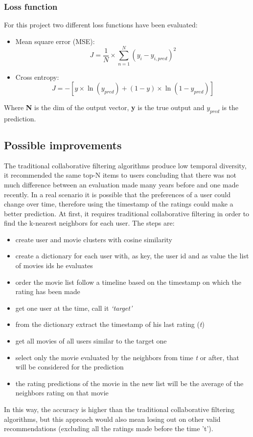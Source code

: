 \documentclass{article}
\begin{document}
\subsubsection{Loss function}
For this project two different loss functions have been evaluated: 
\begin{itemize}
    \item Mean square error (MSE):
    \begin{equation}\nonumber
        J = \frac{1}{N} \times \sum_{n=1}^{N} (y_i - y_{i,pred})^2
    \end{equation}
    
    \item Cross entropy:
    \begin{equation}\nonumber
        J = -[y \times \ln(y_{pred}) + (1 - y) \times \ln(1 - y_{pred})]
    \end{equation}
\end{itemize}

Where \textbf{N} is the dim of the output vector, \textbf{y} is the true output and \textbf{$y_{pred}$} is  the  prediction.




\subsection{Possible improvements}
The traditional collaborative filtering algorithms produce low temporal diversity, it recommended the same top-N items to users concluding that there was not much difference between an evaluation made many years before and one made recently. In a real scenario it is possible that the preferences of a user could change over time, therefore using the timestamp of the ratings could make a better prediction. At first, it requires traditional collaborative filtering in order to find the k-nearest neighbors for each user. The steps are:
\begin{itemize}
      \item create user and movie clusters with cosine similarity
      \item create a dictionary for each user with, as key, the user id and as value the list of movies ids he evaluates
      \item order the movie list follow a timeline based on the timestamp on which the rating has been made
      \item get one user at the time, call it \textsl{‘target’}
      \item from the dictionary extract the timestamp of his last rating (\textsl{t})
      \item get all movies of all users similar to the target one
      \item select only the movie evaluated by the neighbors from time \textsl{t} or after, that will be considered for the prediction
      \item the rating predictions of the movie in the new list will be the average of the neighbors rating on that movie
\end{itemize}
In this way, the accuracy is higher than the traditional collaborative filtering algorithms, but this approach would also mean losing out on other valid recommendations (excluding all the ratings made before the time ’t’).
\end{document}
